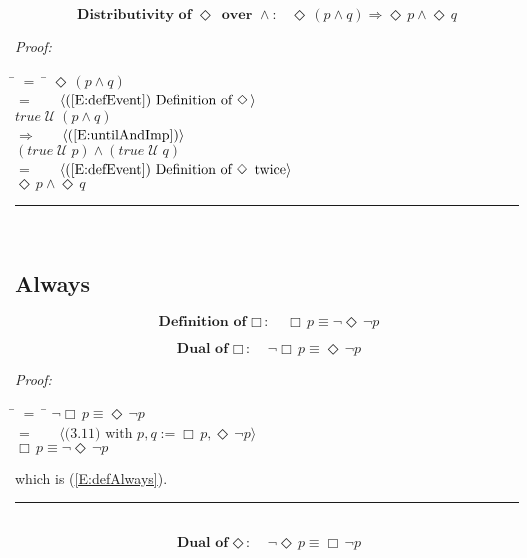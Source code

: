 \documentclass[fleqn, leqno]{article}
\newcommand{\lgap}{2pt}                             %
\newcommand{\mymathindent}{24pt}                    %
\newcommand{\Until}{\;\mathcal{U}\;}
\newcommand{\Event}{\Diamond\,}
\newcommand{\Always}{\Box\,}
\newcommand{\myqed}{\hfill\rule[-.23ex]{1.2ex}{2.0ex}}
\newcommand{\Gll} {\langle}                         %
\newcommand{\Ggg} {\rangle}                         %
\newcommand{\Hint}[1]     {\ \ \ $\Gll              \mbox{#1} \Ggg$ }   %
\begin{document}
\begin{equation}\label{E:distEventAnd}
\textbf{Distributivity of $\Event$ over $\land$:}\quad \Event(p \land q) \Rightarrow \Event p \land \Event q
\end{equation}

\emph{Proof:}
\begin{tabbing}
\hspace{\mymathindent} \= $= \;$ \= \kill
  \> \>   $\Event(p \land q)$\\[\lgap]
  \> $=$  \>  \Hint{(\ref{E:defEvent}) Definition of $\Event$}\\[\lgap]
  \> \>   $true \Until (p \land q)$\\[\lgap]
  \> $\Rightarrow$  \>  \Hint{(\ref{E:untilAndImp})}\\[\lgap]
  \> \>   $(true \Until p) \land (true \Until q)$\\[\lgap]
  \> $=$  \>  \Hint{(\ref{E:defEvent}) Definition of $\Event$ twice}\\[\lgap]
  \> \>   $\Event p \land \Event q$\\[\lgap]
\end{tabbing}
\myqed\\[\lgap]

\subsection{Always}

\begin{equation}\label{E:defAlways}
\textbf{Definition of $\Always$:}\quad \Always p \equiv \lnot\Event\lnot p
\end{equation}


\begin{equation}\label{E:dualAlways}
\textbf{Dual of $\Always$:}\quad \lnot\Always p \equiv \Event\lnot p
\end{equation}

\emph{Proof:}
\begin{tabbing}
\hspace{\mymathindent} \= $= \;$ \= \kill
  \> \>   $\lnot\Always p \equiv \Event\lnot p$\\[\lgap]
  \> $=$  \>  \Hint{(3.11) with $p,q := \Always p, \Event\lnot p$}\\[\lgap]
  \> \>   $\Always p \equiv \lnot\Event\lnot p$
\end{tabbing}
which is (\ref{E:defAlways}). \myqed\\[\lgap]


\begin{equation}\label{E:dualEvent}
\textbf{Dual of $\Event$:}\quad \lnot\Event p \equiv \Always\lnot p
\end{equation}
\end{document}
